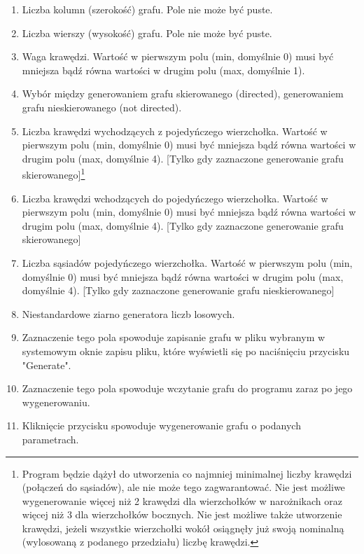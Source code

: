 \documentclass[11pt,a4paper]{report}
\begin{document}
    \begin{enumerate}
        \item Liczba kolumn (szerokość) grafu. Pole nie może być puste.
        \item Liczba wierszy (wysokość) grafu. Pole nie może być puste.
        \item Waga krawędzi. Wartość w pierwszym polu (min, domyślnie 0) musi być mniejsza bądź równa wartości w drugim polu (max, domyślnie 1).
        \item Wybór między generowaniem grafu skierowanego (directed), generowaniem grafu nieskierowanego (not directed).
        \item Liczba krawędzi wychodzących z pojedyńczego wierzchołka. Wartość w pierwszym polu (min, domyślnie 0) musi być mniejsza bądź równa wartości w drugim polu (max, domyślnie 4). [Tylko gdy zaznaczone generowanie grafu skierowanego]\footnote{Program będzie dążył do utworzenia co najmniej minimalnej liczby krawędzi (połączeń do sąsiadów), ale nie może tego zagwarantować. Nie jest możliwe wygenerowanie więcej niż 2 krawędzi dla wierzchołków w narożnikach oraz więcej niż 3 dla wierzchołków bocznych. Nie jest możliwe także utworzenie krawędzi, jeżeli wszystkie wierzchołki wokół osiągnęły już swoją nominalną (wylosowaną z podanego przedziału) liczbę krawędzi.}
        \item Liczba krawędzi wchodzących do pojedyńczego wierzchołka. Wartość w pierwszym polu (min, domyślnie 0) musi być mniejsza bądź równa wartości w drugim polu (max, domyślnie 4). [Tylko gdy zaznaczone generowanie grafu skierowanego]\footnotemark[\value{footnote}]
        \item Liczba sąsiadów pojedyńczego wierzchołka. Wartość w pierwszym polu (min, domyślnie 0) musi być mniejsza bądź równa wartości w drugim polu (max, domyślnie 4). [Tylko gdy zaznaczone generowanie grafu nieskierowanego]\footnotemark[\value{footnote}]
        \item Niestandardowe ziarno generatora liczb losowych.
        \item Zaznaczenie tego pola spowoduje zapisanie grafu w pliku wybranym w systemowym oknie zapisu pliku, które wyświetli się po naciśnięciu przycisku "Generate".
        \item Zaznaczenie tego pola spowoduje wczytanie grafu do programu zaraz po jego wygenerowaniu.
        \item Kliknięcie przycisku spowoduje wygenerowanie grafu o podanych parametrach.
    \end{enumerate}
\end{document}
